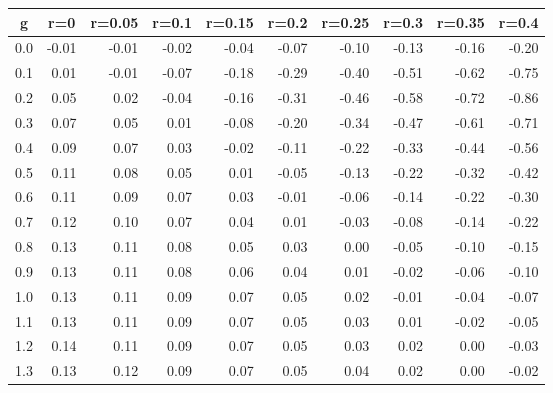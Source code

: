 %
\begin{table}[!tbp]
 \begin{center}
 \begin{tabular}{rrrrrrrrrr}\hline\hline
\multicolumn{1}{c}{g}&\multicolumn{1}{c}{r=0}&\multicolumn{1}{c}{r=0.05}&\multicolumn{1}{c}{r=0.1}&\multicolumn{1}{c}{r=0.15}&\multicolumn{1}{c}{r=0.2}&\multicolumn{1}{c}{r=0.25}&\multicolumn{1}{c}{r=0.3}&\multicolumn{1}{c}{r=0.35}&\multicolumn{1}{c}{r=0.4}\tabularnewline
\hline
0.0&-0.01&-0.01&-0.02&-0.04&-0.07&-0.10&-0.13&-0.16&-0.20\tabularnewline
0.1& 0.01&-0.01&-0.07&-0.18&-0.29&-0.40&-0.51&-0.62&-0.75\tabularnewline
0.2& 0.05& 0.02&-0.04&-0.16&-0.31&-0.46&-0.58&-0.72&-0.86\tabularnewline
0.3& 0.07& 0.05& 0.01&-0.08&-0.20&-0.34&-0.47&-0.61&-0.71\tabularnewline
0.4& 0.09& 0.07& 0.03&-0.02&-0.11&-0.22&-0.33&-0.44&-0.56\tabularnewline
0.5& 0.11& 0.08& 0.05& 0.01&-0.05&-0.13&-0.22&-0.32&-0.42\tabularnewline
0.6& 0.11& 0.09& 0.07& 0.03&-0.01&-0.06&-0.14&-0.22&-0.30\tabularnewline
0.7& 0.12& 0.10& 0.07& 0.04& 0.01&-0.03&-0.08&-0.14&-0.22\tabularnewline
0.8& 0.13& 0.11& 0.08& 0.05& 0.03& 0.00&-0.05&-0.10&-0.15\tabularnewline
0.9& 0.13& 0.11& 0.08& 0.06& 0.04& 0.01&-0.02&-0.06&-0.10\tabularnewline
1.0& 0.13& 0.11& 0.09& 0.07& 0.05& 0.02&-0.01&-0.04&-0.07\tabularnewline
1.1& 0.13& 0.11& 0.09& 0.07& 0.05& 0.03& 0.01&-0.02&-0.05\tabularnewline
1.2& 0.14& 0.11& 0.09& 0.07& 0.05& 0.03& 0.02& 0.00&-0.03\tabularnewline
1.3& 0.13& 0.12& 0.09& 0.07& 0.05& 0.04& 0.02& 0.00&-0.02\tabularnewline
\hline
\end{tabular}

\end{center}

\end{table}

